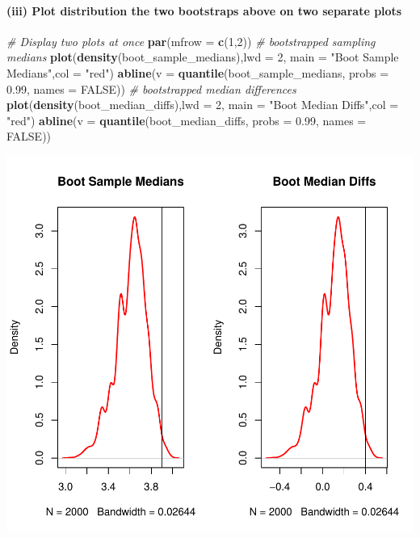 \documentclass[
]{article}
\newenvironment{Shaded}{\begin{snugshade}}{\end{snugshade}}
\newcommand{\AttributeTok}[1]{\textcolor[rgb]{0.13,0.29,0.53}{#1}}
\newcommand{\CommentTok}[1]{\textcolor[rgb]{0.56,0.35,0.01}{\textit{#1}}}
\newcommand{\ConstantTok}[1]{\textcolor[rgb]{0.56,0.35,0.01}{#1}}
\newcommand{\DecValTok}[1]{\textcolor[rgb]{0.00,0.00,0.81}{#1}}
\newcommand{\FloatTok}[1]{\textcolor[rgb]{0.00,0.00,0.81}{#1}}
\newcommand{\FunctionTok}[1]{\textcolor[rgb]{0.13,0.29,0.53}{\textbf{#1}}}
\newcommand{\NormalTok}[1]{#1}
\newcommand{\StringTok}[1]{\textcolor[rgb]{0.31,0.60,0.02}{#1}}
\begin{document}
\hypertarget{iii-plot-distribution-the-two-bootstraps-above-on-two-separate-plots}{%
\paragraph{(iii) Plot distribution the two bootstraps above on two
separate
plots}\label{iii-plot-distribution-the-two-bootstraps-above-on-two-separate-plots}}

\begin{Shaded}
\begin{Highlighting}[]
\CommentTok{\# Display two plots at once}
\FunctionTok{par}\NormalTok{(}\AttributeTok{mfrow =} \FunctionTok{c}\NormalTok{(}\DecValTok{1}\NormalTok{,}\DecValTok{2}\NormalTok{))}
\CommentTok{\# bootstrapped sampling medians}
\FunctionTok{plot}\NormalTok{(}\FunctionTok{density}\NormalTok{(boot\_sample\_medians),}\AttributeTok{lwd =} \DecValTok{2}\NormalTok{, }\AttributeTok{main =} \StringTok{"Boot Sample Medians"}\NormalTok{,}\AttributeTok{col =} \StringTok{"red"}\NormalTok{)}
\FunctionTok{abline}\NormalTok{(}\AttributeTok{v =} \FunctionTok{quantile}\NormalTok{(boot\_sample\_medians, }\AttributeTok{probs =} \FloatTok{0.99}\NormalTok{, }\AttributeTok{names =} \ConstantTok{FALSE}\NormalTok{))}
\CommentTok{\# bootstrapped median differences}
\FunctionTok{plot}\NormalTok{(}\FunctionTok{density}\NormalTok{(boot\_median\_diffs),}\AttributeTok{lwd =} \DecValTok{2}\NormalTok{, }\AttributeTok{main =} \StringTok{"Boot Median Diffs"}\NormalTok{,}\AttributeTok{col =} \StringTok{"red"}\NormalTok{)}
\FunctionTok{abline}\NormalTok{(}\AttributeTok{v =} \FunctionTok{quantile}\NormalTok{(boot\_median\_diffs, }\AttributeTok{probs =} \FloatTok{0.99}\NormalTok{, }\AttributeTok{names =} \ConstantTok{FALSE}\NormalTok{))}
\end{Highlighting}
\end{Shaded}

\includegraphics[width=0.9\linewidth]{bacs_hw4_files/figure-latex/unnamed-chunk-10-1}
\end{document}
